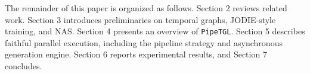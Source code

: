 \documentclass[sigconf, nonacm]{acmart}
\begin{document}
The remainder of this paper is organized as follows. Section 2 reviews
related work. Section 3 introduces preliminaries on temporal graphs,
JODIE-style training, and NAS. Section 4 presents an overview of
\texttt{PipeTGL}. Section 5 describes faithful parallel execution,
including the pipeline strategy and asynchronous generation engine.
Section 6 reports experimental results, and Section 7 concludes.



\end{document}

